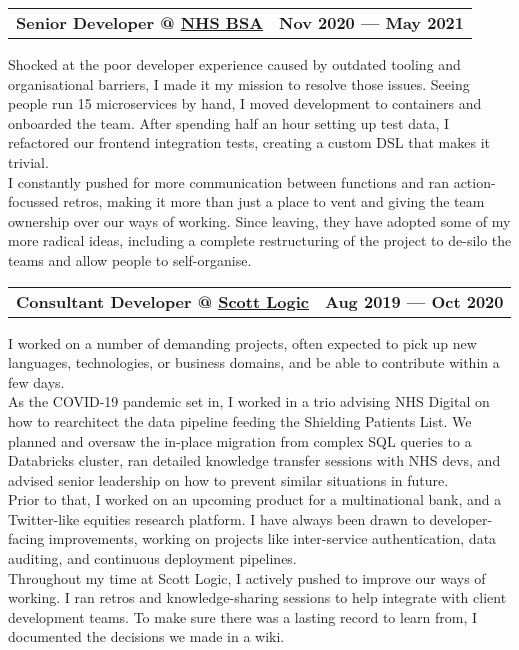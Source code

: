 \documentclass[hidelinks, 12pt, a4paper]{article}
\begin{document}
	\begin{tabularx}{\linewidth}{@{}Xr@{}}
		\textbf{Senior Developer @ \href{https://www.nhsbsa.nhs.uk/}{NHS BSA}} & \textbf{Nov 2020 --- May 2021}
	\end{tabularx}\vspace{2pt}
	
	\begin{multicols}{2}
		Shocked at the poor developer experience caused by outdated tooling and organisational barriers, I made it my mission to resolve those issues.
		Seeing people run 15 microservices by hand, I moved development to containers and onboarded the team.
		After spending half an hour setting up test data, I refactored our frontend integration tests, creating a custom DSL that makes it trivial.\\
		
		I constantly pushed for more communication between functions and ran action-focussed retros, making it more than just a place to vent and giving the team ownership over our ways of working.
		Since leaving, they have adopted some of my more radical ideas, including a complete restructuring of the project to de-silo the teams and allow people to self-organise.\\
	\end{multicols}

	\begin{tabularx}{\linewidth}{@{}Xr@{}}
		\textbf{Consultant Developer @ \href{https://www.scottlogic.com/}{Scott Logic}} & \textbf{Aug 2019 --- Oct 2020}
	\end{tabularx}\vspace{2pt}
	
	\begin{multicols}{2}
		I worked on a number of demanding projects, often expected to pick up new languages, technologies, or business domains, and be able to contribute within a few days.\\
		
		As the COVID-19 pandemic set in, I worked in a trio advising NHS Digital on how to rearchitect the data pipeline feeding the Shielding Patients List.
		We planned and oversaw the in-place migration from complex SQL queries to a Databricks cluster, ran detailed knowledge transfer sessions with NHS devs, and advised senior leadership on how to prevent similar situations in future.\\
		
		Prior to that, I worked on an upcoming product for a multinational bank, and a Twitter-like equities research platform.
		I have always been drawn to developer-facing improvements, working on projects like inter-service authentication, data auditing, and continuous deployment pipelines.\\
		
		Throughout my time at Scott Logic, I actively pushed to improve our ways of working.
		I ran retros and knowledge-sharing sessions to help integrate with client development teams.
		To make sure there was a lasting record to learn from, I documented the decisions we made in a wiki.\\
	\end{multicols}
\end{document}

